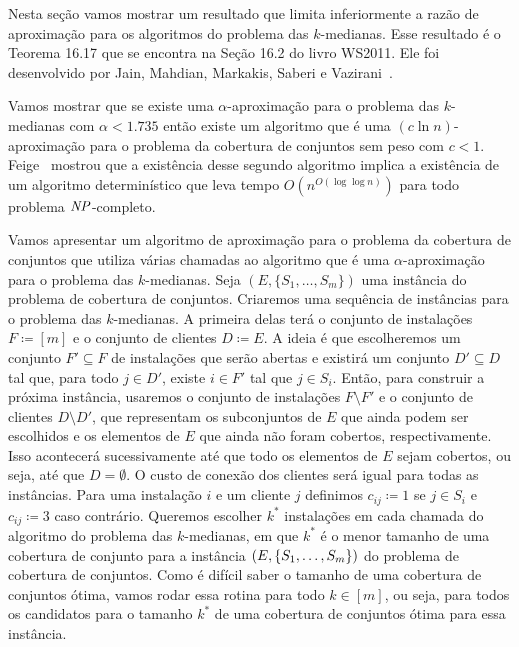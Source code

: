 Nesta seção vamos mostrar um resultado que limita inferiormente a razão de aproximação para os algoritmos do problema das $k$-medianas. Esse resultado é o Teorema 16.17 que se encontra na Seção 16.2 do livro WS2011. Ele foi desenvolvido por Jain, Mahdian, Markakis, Saberi e Vazirani~\cite{jain2002greedy}.

Vamos mostrar que se existe uma $\alpha$-aproximação para o problema das $k$-medianas com $\alpha < 1.735$ então existe um algoritmo que é uma $(c \ln n)$-aproximação para o problema da cobertura de conjuntos sem peso com $c<1$. 
Feige~\cite{Feige98} mostrou que a existência desse segundo algoritmo implica a existência de um algoritmo determinístico que leva tempo $O(n^{O(\log\log n)})$ para todo problema $\mathit{NP}$-completo.

Vamos apresentar um algoritmo de aproximação para o problema da cobertura de conjuntos que utiliza várias chamadas ao algoritmo que é uma $\alpha$-aproximação para o problema das $k$-medianas. 
Seja $(E,\{S_1,\ldots,S_m\})$ uma instância do problema de cobertura de conjuntos. Criaremos uma sequência de instâncias para o problema das $k$-medianas. 
A primeira delas terá o conjunto de instalações $F \coloneqq [m]$ e o conjunto de clientes $D \coloneqq E$. 
A ideia é que escolheremos um conjunto $F' \subseteq F$ de instalações que serão abertas e existirá um conjunto $D' \subseteq D$ tal que, para todo $j \in D'$, existe $i \in F'$ tal que $j \in S_i$. 
Então, para construir a próxima instância, usaremos o conjunto de instalações $F \setminus F'$ e o conjunto de clientes $D \setminus D'$, que representam os subconjuntos de $E$ que ainda podem ser escolhidos e os elementos de $E$ que ainda não foram cobertos, respectivamente.
Isso acontecerá sucessivamente até que todo os elementos de $E$ sejam cobertos, ou seja, até que $D = \emptyset$.
O custo de conexão dos clientes será igual para todas as instâncias. Para uma instalação $i$ e um cliente $j$ definimos $c_{ij}\coloneqq 1$ se $j \in S_i$ e $c_{ij} \coloneqq 3$ caso contrário.
Queremos escolher $k^*$ instalações em cada chamada do algoritmo do problema das $k$-medianas, em que $k^*$ é o menor tamanho de uma cobertura de conjunto para a instância $(E,\{S_1,\ldots,S_m\})$ do problema de cobertura de conjuntos. Como é difícil saber o tamanho de uma cobertura de conjuntos ótima, vamos rodar essa rotina para todo $k \in [m]$, ou seja, para todos os candidatos para o tamanho $k^*$ de uma cobertura de conjuntos ótima para essa instância.

